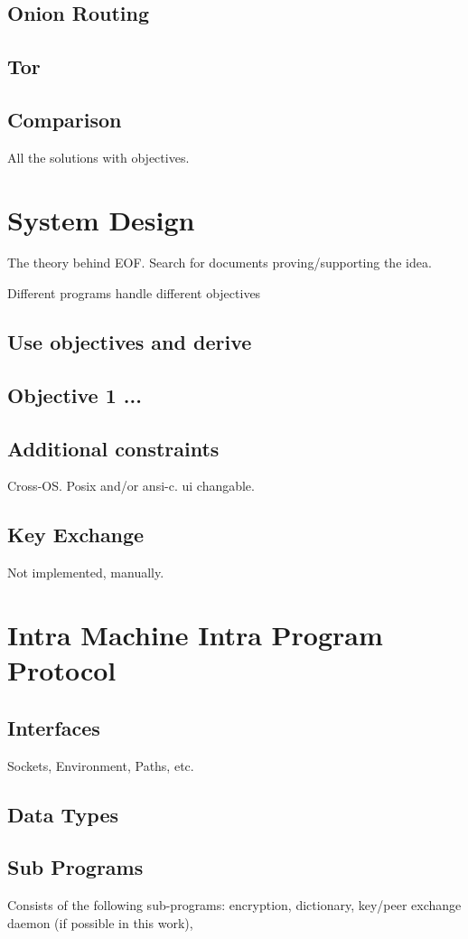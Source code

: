 \documentclass[12pt,a4paper]{article}
\begin{document}
\subsection{Onion Routing}
\subsection{Tor}
\subsection{Comparison}
All the solutions with objectives.

\section{System Design}
The theory behind EOF.
Search for documents proving/supporting the idea.

Different programs handle different objectives
\subsection{Use objectives and derive}
\subsection{Objective 1 ...}
\subsection{Additional constraints}
Cross-OS. Posix and/or ansi-c. ui changable.
\subsection{Key Exchange}
Not implemented, manually.
\section{Intra Machine Intra Program Protocol}
\subsection{Interfaces}
Sockets, Environment, Paths, etc.
\subsection{Data Types}
\subsection{Sub Programs}
Consists of the following sub-programs:
encryption, dictionary, key/peer exchange daemon (if possible in this work),
\end{document}

